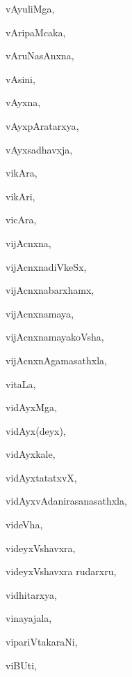 \begin{multicols}{3}
{\noindent
{vAyuliMga}, \pageref{vAyuliMga}

\noindent
{vAripaMcaka}, \pageref{vAripaMcaka}

\noindent
{vAruNasAnxna}, \pageref{vAruNasAnxna}

\noindent
{vAsini}, \pageref{vAsini}

\noindent
{vAyxna}, \pageref{vAyxna}

\noindent
{vAyxpAratarxya}, \pageref{vAyxpAratarxya}

\noindent
{vAyxsadhavxja}, \pageref{vAyxsadhavxja}

\noindent
{vikAra}, \pageref{vikAra}

\noindent
{vikAri}, \pageref{vikAri}

\noindent
{vicAra}, \pageref{vicAra}

\noindent
{vijAcnxna}, \pageref{vijAcnxna}

\noindent
{vijAcnxnadiVkeSx}, \pageref{vijAcnxnadiVkeSx}

\noindent
{vijAcnxnabarxhamx}, \pageref{vijAcnxnabarxhamx}

\noindent
{vijAcnxnamaya}, \pageref{vijAcnxnamaya}

\noindent
{vijAcnxnamayakoVsha}, \pageref{vijAcnxnamayakoVsha}

\noindent
{vijAcnxnAgamasathxla}, \pageref{vijAcnxnAgamasathxla}

\noindent
{vitaLa}, \pageref{vitaLa}

\noindent
{vidAyxMga}, \pageref{vidAyxMga}

\noindent
{vidAyx(deyx)}, \pageref{vidAyxdeyx}

\noindent
{vidAyxkale}, \pageref{vidAyxkale}

\noindent
{vidAyxtatatxvX}, \pageref{vidAyxtatatxvX}

\noindent
{vidAyxvAdanirasanasathxla}, \pageref{vidAyxvAdanirasanasathxla}

\noindent
{videVha}, \pageref{videVha}

\noindent
{videyxVshavxra}, \pageref{videyxVshavxra}

\noindent
{videyxVshavxra rudarxru}, \pageref{videyxVshavxrarudarxru}

\noindent
{vidhitarxya}, \pageref{vidhitarxya}

\noindent
{vinayajala}, \pageref{vinayajala}

\noindent
{vipariVtakaraNi}, \pageref{vipariVtakaraNi}

\noindent
{viBUti}, \pageref{viBUti}

}
\end{multicols}
